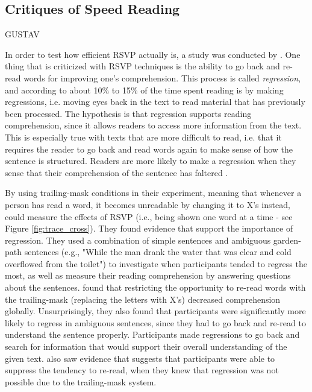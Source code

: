 \subsection{Critiques of Speed Reading}
GUSTAV

In order to test how efficient RSVP actually is, a study was conducted by . One thing that is criticized with RSVP techniques is the ability to go back and re-read words for improving one's comprehension. This process is called \textit{regression}, and according to \citeauthor{schotter_dont_2014} about 10\% to 15\% of the time spent reading is by making regressions, i.e. moving eyes back in the text to read material that has previously been processed. The hypothesis is that regression supports reading comprehension, since it allows readers to access more information from the text. This is especially true with texts that are more difficult to read, i.e. that it requires the reader to go back and read words again to make sense of how the sentence is structured. Readers are more likely to make a regression when they sense that their comprehension of the sentence has faltered \cite{schotter_dont_2014}.

By using trailing-mask conditions in their experiment, meaning that whenever a person has read a word, it becomes unreadable by changing it to X's instead,  could measure the effects of RSVP (i.e., being shown one word at a time - see Figure \ref{fig:trace_cross}). They found evidence that support the importance of regression. They used a combination of simple sentences and ambiguous garden-path sentences (e.g., "While
the man drank the water that was clear and cold overflowed from the toilet") to investigate when participants tended to regress the most, as well as measure their reading comprehension by answering questions about the sentences. \citeauthor{schotter_dont_2014} found that restricting the opportunity to re-read words with the trailing-mask (replacing the letters with X's) decreased comprehension globally. Unsurprisingly, they also found that participants were significantly more likely to regress in ambiguous sentences, since they had to go back and re-read to understand the sentence properly. Participants made regressions to go back and search for information that would support their overall understanding of the given text. \citeauthor{schotter_dont_2014} also saw evidence that suggests that participants were able to suppress the tendency to re-read, when they knew that regression was not possible due to the trailing-mask system.

